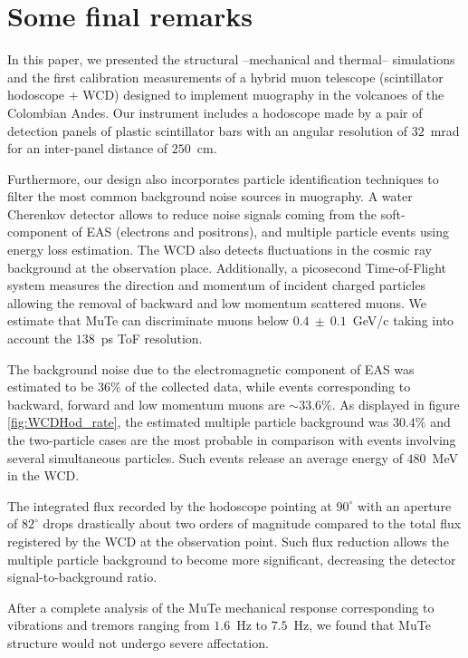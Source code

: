 \documentclass[letterpaper,11pt]{article}
\begin{document}
\section{Some final remarks}
\label{conclusions}
In this paper, we presented the structural --mechanical and thermal-- simulations and the first calibration measurements of a hybrid muon telescope (scintillator hodoscope + WCD) designed to implement muography in the volcanoes of the Colombian Andes. Our instrument includes a hodoscope made by a pair of detection panels of plastic scintillator bars with an angular resolution of $32$~mrad for an inter-panel distance of $250$~cm. 

Furthermore, our design also incorporates particle identification techniques to filter the most common background noise sources in muography. A water Cherenkov detector allows to reduce noise signals coming from the soft-component of EAS (electrons and positrons), and multiple particle events using energy loss estimation. The WCD also detects fluctuations in the cosmic ray background at the observation place. Additionally, a picosecond Time-of-Flight system measures the direction and momentum of incident charged particles allowing the removal of backward and low momentum scattered muons. We estimate that MuTe can discriminate muons below  $0.4~\pm~0.1$~GeV/c taking into account the $138$~ps ToF resolution.

 The background noise due to the electromagnetic component of EAS was estimated to be $36\%$ of the collected data, while events corresponding to backward, forward and low momentum muons are $\sim 33.6\%$. As displayed in figure \ref{fig:WCDHod_rate}, the estimated multiple particle background was $30.4\%$ and the two-particle cases are the most probable in comparison with events involving several simultaneous particles. Such events release an average energy of $480$~MeV in the WCD.

The integrated flux recorded by the hodoscope pointing at $90^{\circ}$ with an aperture of $82^{\circ}$ drops drastically about two orders of magnitude compared to the total flux registered by the WCD at the observation point. Such flux reduction allows the multiple particle background to become more significant, decreasing the detector signal-to-background ratio.

After a complete analysis of the MuTe mechanical response corresponding to vibrations and tremors ranging from $1.6$~Hz to $7.5$~Hz, we found that MuTe structure would not undergo severe affectation. 
\end{document}
